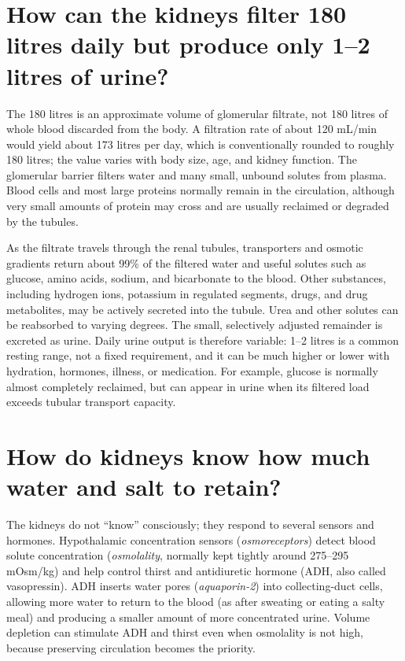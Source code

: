 \documentclass[11pt,oneside]{report}
\begin{document}
\section{How can the kidneys filter 180 litres daily but produce only 1--2 litres of urine?}

The 180 litres is an approximate volume of glomerular filtrate, not 180 litres
of whole blood discarded from the body. A filtration rate of about 120 mL/min
would yield about 173 litres per day, which is conventionally rounded to
roughly 180 litres; the value varies with body size, age, and kidney function.
The glomerular barrier filters water and many small, unbound solutes from
plasma. Blood cells and most large proteins normally remain in the circulation,
although very small amounts of protein may cross and are usually reclaimed or
degraded by the tubules.

As the filtrate travels through the renal tubules, transporters and osmotic
gradients return about 99\% of the filtered water and useful solutes such as
glucose, amino acids, sodium, and bicarbonate to the blood. Other substances,
including hydrogen ions, potassium in regulated segments, drugs, and drug
metabolites, may be actively secreted into the tubule. Urea and other solutes
can be reabsorbed to varying degrees. The small, selectively adjusted
remainder is excreted as urine. Daily urine output is therefore variable:
1--2 litres is a common resting range, not a fixed requirement, and it can be
much higher or lower with hydration, hormones, illness, or medication. For
example, glucose is normally almost completely reclaimed, but can appear in
urine when its filtered load exceeds tubular transport capacity.

\section{How do kidneys know how much water and salt to retain?}

The kidneys do not ``know'' consciously; they respond to several sensors and
hormones. Hypothalamic concentration sensors (\emph{osmoreceptors}) detect blood solute
concentration (\emph{osmolality}, normally kept tightly around 275--295
mOsm/kg) and help control thirst and antidiuretic hormone (ADH, also called
vasopressin). ADH inserts water pores (\emph{aquaporin-2}) into collecting-duct
cells, allowing more water to return to the blood (as after sweating or eating a
salty meal) and producing a smaller amount of more concentrated urine.
Volume depletion can stimulate ADH and thirst even when osmolality is not high,
because preserving circulation becomes the priority.
\end{document}
